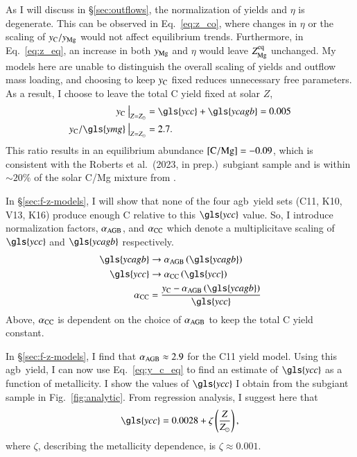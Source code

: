 \documentclass[12pt,oneside,letterpaper]{report}
\newcommand{\agb}{\gls{agb}}
\newcommand{\Ycc}{\gls{ycc}}
\newcommand{\Yoc}{\gls{ymg}}
\newcommand{\Ycagb}{\gls{ycagb}}
\newcommand{\Yct}{\ensuremath{y_{\rm C}}}
\newcommand{\citetjack}{Roberts et al.~(2023, in prep.)}
\newcommand{\about}[1]{${\sim} #1$}
\begin{document}
As I will discuss in \S\ref{sec:outflows}, the normalization of yields and $\eta$ is degenerate. This can be observed in Eq.~\ref{eq:z_co}, where changes in $\eta$ or the scaling of $y_{\rm C}/y_{\rm Mg}$ would not affect equilibrium trends. Furthermore, in Eq.~\ref{eq:z_eq}, an increase in both $y_{\rm Mg}$ and $\eta$ would leave $Z_{\rm Mg}^{\rm eq}$ unchanged. My models here are unable to distinguish the overall scaling of yields and outflow mass loading, and choosing to keep $y_{\rm C}$ fixed reduces unnecessary free parameters. 
%
As a result, I choose to leave the total C yield fixed at solar $Z$,
\begin{subequations}
    \begin{align}
        \Yct~\big\vert_{Z=Z_\odot} &= \Ycc + \Ycagb = 0.005 \\
        \Yct/\Yoc~\big\vert_{Z=Z_\odot} &= 2.7.
    \end{align}
\end{subequations}
This ratio results in an equilibrium abundance ${\rm [C/Mg]} = -0.09$, which is consistent with the \citetjack~subgiant sample and is within \about{20\%} of the solar C/Mg mixture from \citet{asplund+09}.

In \S\ref{sec:f-z-models}, I will show that none of the four \agb\ yield sets (C11, K10, V13, K16) produce enough C relative to this $\Ycc$ value. So, I introduce normalization factors, $\alpha_{\rm AGB}$, and $\alpha_{\rm CC}$ which denote a multiplicitave scaling of $\Ycc$ and $\Ycagb$ respectively. 
\begin{subequations} \label{eq:alpha}
    \begin{align}
        \Ycagb &\rightarrow \alpha_{\rm AGB} \left(\Ycagb\right) \\
        \Ycc &\rightarrow \alpha_{\rm CC} \left(\Ycc\right)\\
        \alpha_{\rm CC} &= \frac{\Yct - \alpha_{\rm AGB} \left(\Ycagb\right)}{\Ycc}
    \end{align}
\end{subequations}
Above, $\alpha_{\rm CC}$ is dependent on the choice of $\alpha_{\rm AGB}$ to keep the total C yield constant. 

In \S\ref{sec:f-z-models}, I find that $\alpha_{\rm AGB}\approx 2.9$ for the C11 yield model. Using this \agb\ yield, I can now use Eq.~\ref{eq:y_c_eq} to find an estimate of $\Ycc$ as a function of metallicity. I show the values of $\Ycc$ I obtain from the subgiant sample in Fig.~\ref{fig:analytic}. From regression analysis, I suggest here that
\begin{equation}
    \Ycc = 0.0028 + \zeta\left(\frac{Z}{Z_\odot}\right),
\end{equation}
where $\zeta$, describing the metallicity dependence, is $\zeta\approx0.001$.
\end{document}
